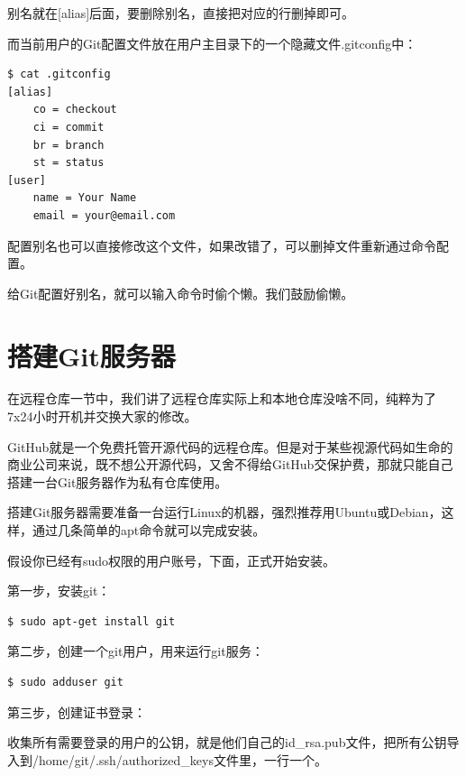 别名就在[alias]后面，要删除别名，直接把对应的行删掉即可。

而当前用户的Git配置文件放在用户主目录下的一个隐藏文件.gitconfig中：

\begin{verbatim}
$ cat .gitconfig
[alias]
    co = checkout
    ci = commit
    br = branch
    st = status
[user]
    name = Your Name
    email = your@email.com
\end{verbatim}

配置别名也可以直接修改这个文件，如果改错了，可以删掉文件重新通过命令配置。

\begin{tcolorbox}

给Git配置好别名，就可以输入命令时偷个懒。我们鼓励偷懒。
\end{tcolorbox}


\section{搭建Git服务器}
在远程仓库一节中，我们讲了远程仓库实际上和本地仓库没啥不同，纯粹为了7x24小时开机并交换大家的修改。

GitHub就是一个免费托管开源代码的远程仓库。但是对于某些视源代码如生命的商业公司来说，既不想公开源代码，又舍不得给GitHub交保护费，那就只能自己搭建一台Git服务器作为私有仓库使用。

搭建Git服务器需要准备一台运行Linux的机器，强烈推荐用Ubuntu或Debian，这样，通过几条简单的apt命令就可以完成安装。

假设你已经有sudo权限的用户账号，下面，正式开始安装。

第一步，安装git：

\begin{verbatim}
$ sudo apt-get install git
\end{verbatim}

第二步，创建一个git用户，用来运行git服务：

\begin{verbatim}
$ sudo adduser git
\end{verbatim}

第三步，创建证书登录：

收集所有需要登录的用户的公钥，就是他们自己的id\_rsa.pub文件，把所有公钥导入到/home/git/.ssh/authorized\_keys文件里，一行一个。

